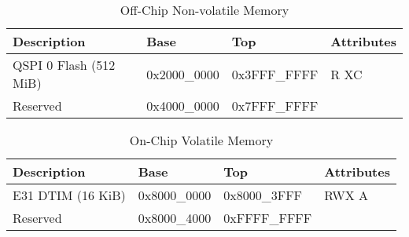 \documentclass[a4paper,12pt,twoside]{report}
\begin{document}
            	\begin{table}[H]
            		\centering
            		\begin{tabular}{| p{4.5cm} | p{3cm} | p{3cm} | p{2.5cm} |}
            			\hline
            			\textbf{Description} & \textbf{Base} & \textbf{Top} & \textbf{Attributes}\\
            			\hline
            			\hline
            			QSPI 0 Flash (512 MiB) & 0x2000\_0000 & 0x3FFF\_FFFF & R XC\\
            			Reserved & 0x4000\_0000 & 0x7FFF\_FFFF & \\
            			\hline
            		\end{tabular}
            		\caption{Off-Chip Non-volatile Memory}
            	\end{table}
            
            	\begin{table}[H]
            		\centering
            		\begin{tabular}{| p{4.5cm} | p{3cm} | p{3cm} | p{2.5cm} |}
            			\hline
            			\textbf{Description} & \textbf{Base} & \textbf{Top} & \textbf{Attributes}\\
            			\hline
            			\hline
            			E31 DTIM (16 KiB) & 0x8000\_0000 & 0x8000\_3FFF & RWX A\\
            			Reserved & 0x8000\_4000 & 0xFFFF\_FFFF & \\
            			\hline
            		\end{tabular}
            		\caption{On-Chip Volatile Memory}
            	\end{table}

    \printbibliography
\end{document}
